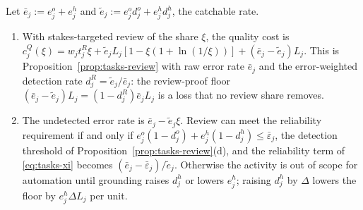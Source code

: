 \begin{proposition}\label{prop:tasks-halluc}
Let $\bar e_j:=e^o_j+e^h_j$ and $\tilde e_j:=e^o_jd^o_j+e^h_jd^h_j$, the catchable rate.
\begin{enumerate}
\item[(a)] With stakes-targeted review of the share $\xi$, the quality cost is $c^Q_j(\xi)=w_jt^R_j\xi+\tilde e_jL_j[1-\xi(1+\ln(1/\xi))]+(\bar e_j-\tilde e_j)L_j$. This is Proposition~\ref{prop:tasks-review} with raw error rate $\bar e_j$ and the error-weighted detection rate $d^R_j=\tilde e_j/\bar e_j$: the review-proof floor $(\bar e_j-\tilde e_j)L_j=(1-d^R_j)\bar e_jL_j$ is a loss that no review share removes.
\item[(b)] The undetected error rate is $\bar e_j-\tilde e_j\xi$. Review can meet the reliability requirement if and only if $e^o_j(1-d^o_j)+e^h_j(1-d^h_j)\le\bar\varepsilon_j$, the detection threshold of Proposition~\ref{prop:tasks-review}(d), and the reliability term of \eqref{eq:tasks-xi} becomes $(\bar e_j-\bar\varepsilon_j)/\tilde e_j$. Otherwise the activity is out of scope for automation until grounding raises $d^h_j$ or lowers $e^h_j$; raising $d^h_j$ by $\Delta$ lowers the floor by $e^h_j\Delta L_j$ per unit.
\end{enumerate}
\end{proposition}

